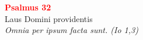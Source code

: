 


\def\greinitialformat#1{%
{\fontsize{39}{39}\selectfont #1}%
}




\vspace{0.3cm}
\begin{center}
 \textcolor{red}{\large \bf Psalmus 32}\\
Laus Domini providentis\\
\textit{\small Omnia per ipsum facta sunt. (Io 1,3)}
\end{center}
